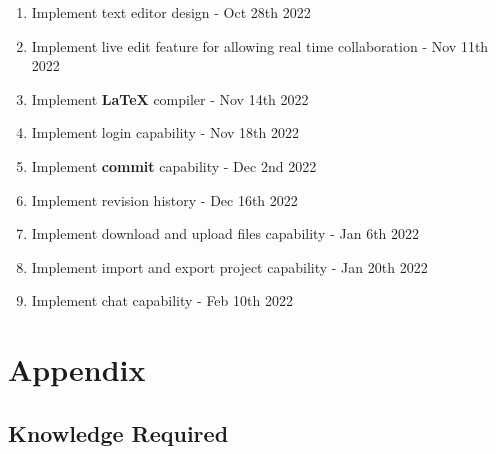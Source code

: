 \documentclass[12pt, titlepage]{article}
\begin{document}
	\begin{enumerate}
		\item Implement text editor design - Oct 28th 2022
		\item Implement live edit feature for allowing real time collaboration - Nov 11th 2022
		\item Implement \textbf{LaTeX} compiler - Nov 14th 2022
		\item Implement login capability - Nov 18th 2022
		\item Implement \textbf{commit} capability - Dec 2nd 2022
		\item Implement revision history - Dec 16th 2022
		\item Implement download and upload files capability - Jan 6th 2022
		\item Implement import and export project capability - Jan 20th 2022
		\item Implement chat capability - Feb 10th 2022
	\end{enumerate}
	
	\newpage
	
	\section{Appendix}
	
	\subsection{Knowledge Required}
	
\end{document}
